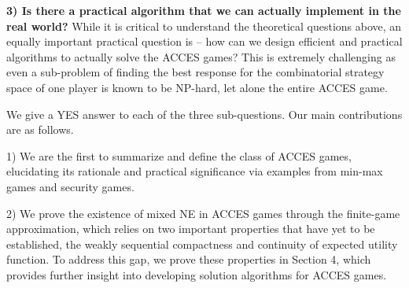 \textbf{3) Is there a practical algorithm that we can actually implement in the real world?} While it is critical to understand the theoretical questions above, an equally important practical question is -- how can we design efficient and practical algorithms to actually solve the ACCES games? This is extremely challenging as even a sub-problem of finding the best response for the combinatorial strategy space of one player is known to be NP-hard, let alone the entire ACCES game. %



We give a YES answer to each of the three sub-questions. Our main contributions are as follows. 

1) We are the first to summarize and define the class of ACCES games, elucidating its rationale and practical significance via examples from min-max games and security games. 

2) We prove the existence of mixed NE in ACCES games through the finite-game approximation, which relies on two important properties that have yet to be established, the weakly sequential compactness and continuity of expected utility function. To address this gap, we prove these properties in Section 4, which provides further insight into developing solution algorithms for ACCES games. 


